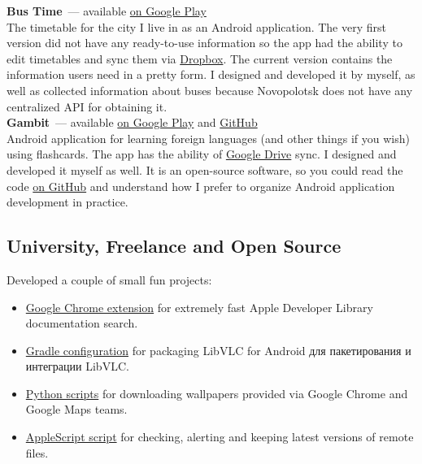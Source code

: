       \textbf{Bus Time}~--- available \href{https://play.google.com/store/apps/details?id=ru.ming13.bustime}{on Google Play} \\

        The timetable for the city I live in as an Android application.
        The very first version did not have any ready-to-use information so the app
        had the ability to edit timetables and sync them via
        \href{https://dropbox.com}{Dropbox}. The current version contains
        the information users need in a pretty form. I designed and developed
        it by myself, as well as collected information about buses because Novopolotsk
        does not have any centralized API for obtaining it. \\

      \textbf{Gambit}~--- available \href{https://play.google.com/store/apps/details?id=ru.ming13.gambit}{on Google Play}
        and \href{https://github.com/ming13/gambit}{GitHub} \\

        Android application for learning foreign languages
        (and other things if you wish) using flashcards.
        The app has the ability of \href{https://drive.google.com}{Google Drive} sync.
        I designed and developed
        it myself as well. It is an open-source software, so you could read the code
        \href{https://github.com/ming13/gambit}{on GitHub} and understand
        how I prefer to organize Android application development in practice.

    \clearpage

    \subsection*{University, Freelance and Open Source}

      Developed a couple of small fun projects:

      \begin{itemize}

        \item \href{для://github.com/ming13/apple-developer-library-search-extensions}{Google Chrome extension}
          for extremely fast Apple Developer Library documentation search.

        \item \href{https://github.com/ming13/libvlc-android}{Gradle configuration}
          for packaging LibVLC for Android
          для пакетирования и интеграции LibVLC.

        \item \href{https://github.com/ming13/google-wallpaper-downloaders}{Python scripts}
          for downloading wallpapers provided via Google Chrome and Google Maps teams.

        \item \href{https://github.com/ming13/watchdog}{AppleScript script}
          for checking, alerting and keeping latest versions of remote files.

      \end{itemize}

